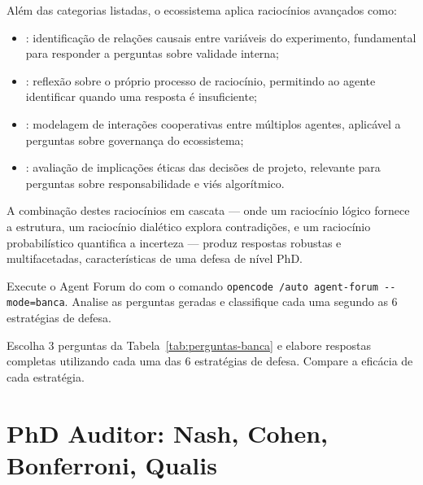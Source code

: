 Além das categorias listadas, o ecossistema aplica raciocínios avançados como:

\begin{itemize}
\item {}: identificação de relações
      causais entre variáveis do experimento, fundamental para responder a
      perguntas sobre validade interna;
\item {}: reflexão sobre o
      próprio processo de raciocínio, permitindo ao agente identificar quando
      uma resposta é insuficiente;
\item {}: modelagem de interações
      cooperativas entre múltiplos agentes, aplicável a perguntas sobre
      governança do ecossistema;
\item {}: avaliação de implicações
      éticas das decisões de projeto, relevante para perguntas sobre
      responsabilidade e viés algorítmico.
\end{itemize}

A combinação destes raciocínios em cascata --- onde um raciocínio lógico
fornece a estrutura, um raciocínio dialético explora contradições, e um
raciocínio probabilístico quantifica a incerteza --- produz respostas
robustas e multifacetadas, características de uma defesa de nível PhD.

\begin{exercicio}
    Execute o Agent Forum do \opencodeeco{} com o comando
    \lstinline{opencode /auto agent-forum --mode=banca}. Analise as perguntas
    geradas e classifique cada uma segundo as 6 estratégias de defesa.
\end{exercicio}

\begin{exercicio}
    Escolha 3 perguntas da Tabela~\ref{tab:perguntas-banca} e elabore
    respostas completas utilizando cada uma das 6 estratégias de defesa.
    Compare a eficácia de cada estratégia.
\end{exercicio}

\section{PhD Auditor: Nash, Cohen, Bonferroni, Qualis}
\label{sec:phd-auditor}
\nivelphd

